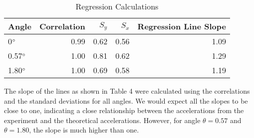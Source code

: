 \documentclass [12pt, letterpaper, twoside] {article}
\begin{document}
\begin{figure}[h!]
  \centering
\end{figure}

\begin {table}[h]
  \centering
  \begin {tabular} {| l | r | r | r | r |}
    \hline\hline
    Angle & Correlation & \(S_{y}\) & \(S_{x}\) & Regression Line Slope \\
    \hline
    0\(\degree\) & 0.99 & 0.62 & 0.56 & 1.09 \\ %
    \hline
    0.57\(\degree\) & 1.00 & 0.81 & 0.62 & 1.29 \\ %
    \hline
    1.80\(\degree\) & 1.00 & 0.69 & 0.58 & 1.19 \\ %
    \hline\hline
  \end {tabular}
  \caption {Regression Calculations}
\end {table}

\noindent
The slope of the lines as shown in Table 4 were calculated using the correlations and the standard deviations for all angles. We would expect all the slopes to be close to one, indicating a close relationship between the accelerations from the experiment and the theoretical accelerations. However, for angle \(\theta = 0.57\) and \(\theta = 1.80\), the slope is much higher than one. \\\\
\end{document}
